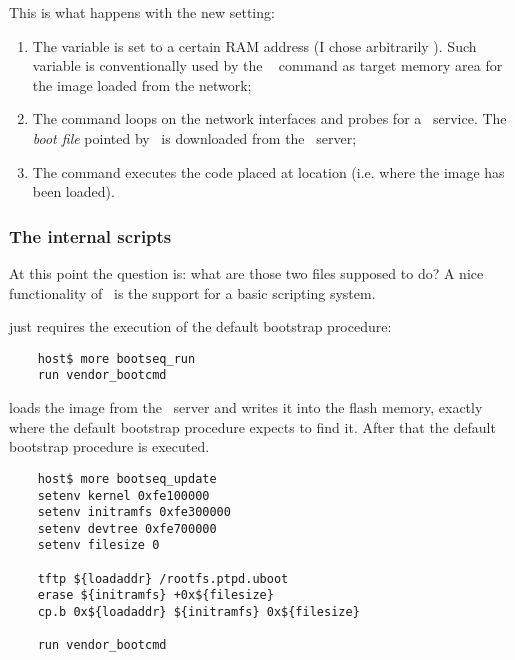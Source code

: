         This is what happens with the new setting:
        \begin{enumerate}
        \item   The  variable is set to a certain RAM
                address (I chose arbitrarily ). Such
                variable is conventionally used by the \uBoot\
                 command as target memory area for the image
                loaded from the network;
        \item   The  command loops on the network interfaces
                and probes for a \BootP\ service. The \emph{boot file}
                pointed by \BootP\ is downloaded from the \TFTP\ server;
        \item   The \Command{source} command executes the code placed at
                location \Const{0x100000} (i.e. where the image has been
                loaded).
        \end{enumerate}

    \subsubsection{The internal scripts}

        At this point the question is: what are those two files supposed to
        do? A nice functionality of \uBoot\ is the support for a basic
        scripting system.

         just requires the execution of the default
        bootstrap procedure:
\begin{lstlisting}
    host$ more bootseq_run
    run vendor_bootcmd
\end{lstlisting}

         loads the 
        image from the \TFTP\ server and writes it into the flash memory,
        exactly where the default bootstrap procedure expects to find it.
        After that the default bootstrap procedure is executed.
\begin{lstlisting}
    host$ more bootseq_update
    setenv kernel 0xfe100000
    setenv initramfs 0xfe300000
    setenv devtree 0xfe700000
    setenv filesize 0

    tftp ${loadaddr} /rootfs.ptpd.uboot
    erase ${initramfs} +0x${filesize}
    cp.b 0x${loadaddr} ${initramfs} 0x${filesize}

    run vendor_bootcmd
\end{lstlisting}

